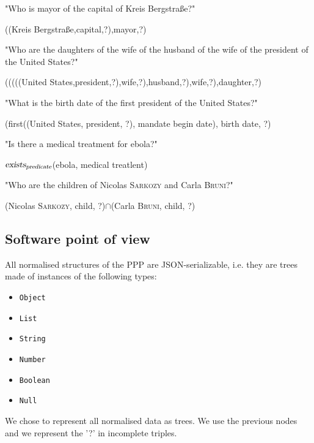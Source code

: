 \bigskip

"Who is mayor of the capital of Kreis Bergstraße?"
\begin{center}((Kreis Bergstraße,capital,?),mayor,?)\end{center}

\bigskip

"Who are the daughters of the wife of the husband of the wife of the president of the United States?"
\begin{center}
(((((United States,president,?),wife,?),husband,?),wife,?),daughter,?)
\end{center}

\bigskip

"What is the birth date of the first president of the United States?"
\begin{center}(first((United States, president, ?), mandate begin date), birth date, ?)\end{center}

\bigskip

"Is there a medical treatment for ebola?"
\begin{center}$\textsl{exists}_{\textsl{predicate}}$(ebola, medical treatlent)\end{center}

\bigskip

"Who are the children of Nicolas \textsc{Sarkozy} and Carla \textsc{Bruni}?"
\begin{center}(Nicolas \textsc{Sarkozy}, child, ?)$\cap$(Carla \textsc{Bruni}, child, ?)\end{center}

\subsection{Software point of view}

All normalised structures of the PPP are JSON-serializable, i.e. they are trees made of instances of the following types:
\begin{itemize}
    \item \texttt{Object}
    \item \texttt{List}
    \item \texttt{String}
    \item \texttt{Number}
    \item \texttt{Boolean}
    \item \texttt{Null}
\end{itemize}

We chose to represent all normalised data as trees. We use the previous nodes and we represent the '?' in incomplete triples.

